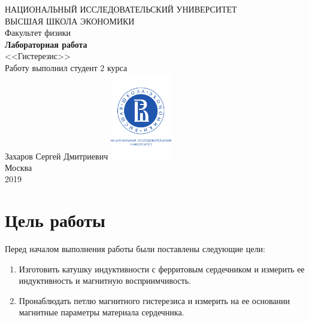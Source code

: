 \documentclass[a4paper, 12pt]{article}
\begin{document}
	\begin{titlepage}
		\begin{center}
			$$$$
			$$$$
			$$$$
			$$$$
			{\Large{НАЦИОНАЛЬНЫЙ ИССЛЕДОВАТЕЛЬСКИЙ УНИВЕРСИТЕТ}}\\
			\vspace{0.1cm}
			{\Large{ВЫСШАЯ ШКОЛА ЭКОНОМИКИ}}\\
			\vspace{0.25cm}
			{\large{Факультет физики}}\\
			\vspace{5.5cm}
			{\Huge\textbf{{Лабораторная работа}}}\\%
			\vspace{1cm}
			{\LARGE{<<Гистерезис>>}}\\%
			\vspace{2cm}
			{Работу выполнил студент 2 курса}\\
			{Захаров Сергей Дмитриевич}
			\vfill
			\includegraphics[width = 0.2\textwidth]{HSElogo}\\
			\vfill
			Москва\\
			2019
		\end{center}
	\end{titlepage}


\tableofcontents

\newpage

\section{Цель работы}

Перед началом выполнения работы были поставлены следующие цели:

\begin{enumerate}
	\item Изготовить катушку индуктивности с ферритовым сердечником и измерить ее индуктивность и магнитную восприимчивость.
	
	\item Пронаблюдать петлю магнитного гистерезиса и измерить на ее основании магнитные параметры материала сердечника.
\end{enumerate}
\end{document}
